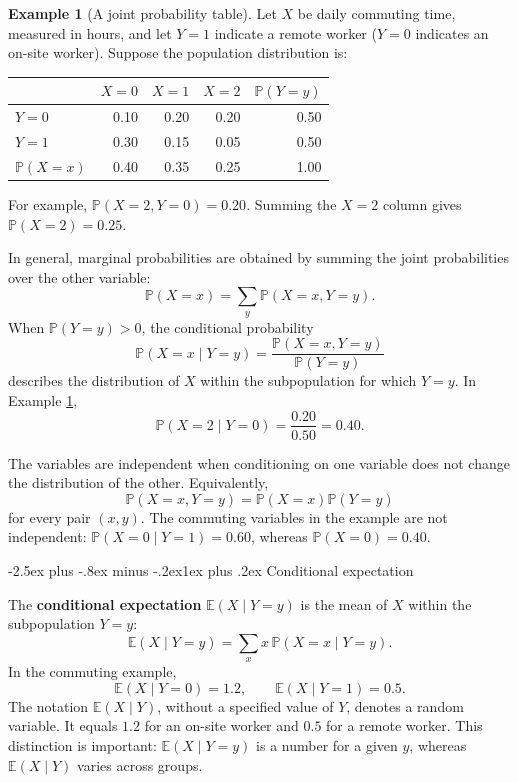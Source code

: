 \documentclass[
  11pt,
]{book}
\makeatletter
\renewcommand\subsection{\@startsection{subsection}{2}{\z@}
  {-2.5ex plus -.8ex minus -.2ex}{1ex plus .2ex}
  {\normalfont\large\bfseries\color{TextbookInk}}}
\theoremstyle{definition}
\theoremstyle{definition}
\newtheorem{example}{Example}[chapter]
\theoremstyle{definition}
\theoremstyle{definition}
\theoremstyle{remark}
\makeatother
\begin{document}
\begin{example}[A joint probability table]
\protect\hypertarget{exm:commuting-table}{}\label{exm:commuting-table}Let \(X\) be daily commuting time, measured in hours, and let \(Y=1\) indicate a remote worker (\(Y=0\) indicates an on-site worker). Suppose the population distribution is:

\begin{longtable}[]{@{}lrrrr@{}}
\toprule\noalign{}
& \(X=0\) & \(X=1\) & \(X=2\) & \(\mathbb{P}(Y=y)\) \\
\midrule\noalign{}
\endhead
\bottomrule\noalign{}
\endlastfoot
\(Y=0\) & 0.10 & 0.20 & 0.20 & 0.50 \\
\(Y=1\) & 0.30 & 0.15 & 0.05 & 0.50 \\
\(\mathbb{P}(X=x)\) & 0.40 & 0.35 & 0.25 & 1.00 \\
\end{longtable}

For example, \(\mathbb{P}(X=2,Y=0)=0.20\). Summing the \(X=2\) column gives \(\mathbb{P}(X=2)=0.25\).
\end{example}

In general, marginal probabilities are obtained by summing the joint probabilities over the other variable:
\[
\mathbb{P}(X=x)=\sum_y\mathbb{P}(X=x,Y=y).
\]
When \(\mathbb{P}(Y=y)>0\), the conditional probability
\[
\mathbb{P}(X=x\mid Y=y)
=\frac{\mathbb{P}(X=x,Y=y)}{\mathbb{P}(Y=y)}
\]
describes the distribution of \(X\) within the subpopulation for which \(Y=y\). In Example \ref{exm:commuting-table},
\[
\mathbb{P}(X=2\mid Y=0)=\frac{0.20}{0.50}=0.40.
\]

The variables are independent when conditioning on one variable does not change the distribution of the other. Equivalently,
\[
\mathbb{P}(X=x,Y=y)=\mathbb{P}(X=x)\mathbb{P}(Y=y)
\]
for every pair \((x,y)\). The commuting variables in the example are not independent: \(\mathbb{P}(X=0\mid Y=1)=0.60\), whereas \(\mathbb{P}(X=0)=0.40\).

\subsection{Conditional expectation}\label{basics-conditional-expectation}

The \textbf{conditional expectation} \(\mathbb{E}(X\mid Y=y)\) is the mean of \(X\) within the subpopulation \(Y=y\):
\[
\mathbb{E}(X\mid Y=y)=\sum_x x\,\mathbb{P}(X=x\mid Y=y).
\]
In the commuting example,
\[
\mathbb{E}(X\mid Y=0)=1.2,\qquad
\mathbb{E}(X\mid Y=1)=0.5.
\]
The notation \(\mathbb{E}(X\mid Y)\), without a specified value of \(Y\), denotes a random variable. It equals \(1.2\) for an on-site worker and \(0.5\) for a remote worker. This distinction is important: \(\mathbb{E}(X\mid Y=y)\) is a number for a given \(y\), whereas \(\mathbb{E}(X\mid Y)\) varies across groups.
\end{document}
